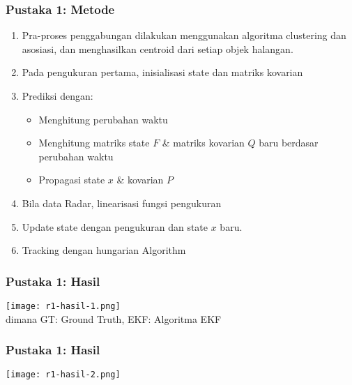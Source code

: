 \begin{frame}
    \frametitle{Pustaka 1: Metode}
    \begin{enumerate}
        \justifying
        \item Pra-proses penggabungan dilakukan menggunakan algoritma clustering dan asosiasi, dan menghasilkan centroid dari setiap objek halangan.
        \item Pada pengukuran pertama, inisialisasi state dan matriks kovarian 
        \item Prediksi dengan:
        \begin{itemize}
            \item Menghitung perubahan waktu
            \item Menghitung matriks state $F$ \& matriks kovarian $Q$ baru berdasar perubahan waktu
            \item Propagasi state $x$ \& kovarian $P$
        \end{itemize} 
        \item Bila data Radar, linearisasi fungsi pengukuran
        \item Update state dengan pengukuran dan state $x$ baru.
        \item Tracking dengan hungarian Algorithm
    \end{enumerate}
\end{frame}


\begin{frame}
    \frametitle{Pustaka 1: Hasil}
    \centering
    \texttt{[image: r1-hasil-1.png]}\\
    dimana GT: Ground Truth, EKF: Algoritma EKF
\end{frame}


\begin{frame}
    \frametitle{Pustaka 1: Hasil}
    \centering
    \texttt{[image: r1-hasil-2.png]}
\end{frame}


